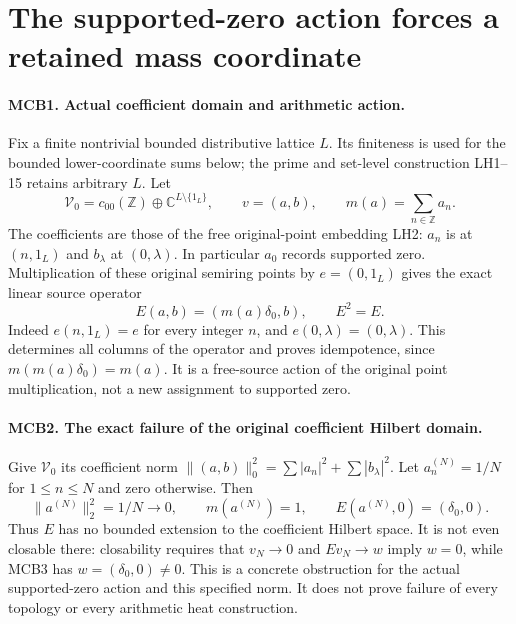 \section{The supported-zero action forces a retained mass coordinate}
\label{sec:supported-zero-mass-completion}

\paragraph{MCB1. Actual coefficient domain and arithmetic action.}
Fix a finite nontrivial bounded distributive lattice \(L\). Its
finiteness is used for the bounded lower-coordinate sums below;
the prime and set-level construction LH1--15 retains arbitrary
\(L\). Let
\[
 \mathcal V_0=c_{00}(\mathbb Z)\oplus
        \mathbb C^{L\setminus\{1_L\}},\qquad v=(a,b),\qquad
 m(a)=\sum_{n\in\mathbb Z}a_n .                    \tag{MCB1}
\]
The coefficients are those of the free original-point embedding
LH2: \(a_n\) is at \((n,1_L)\) and \(b_\lambda\) at
\((0,\lambda)\). In particular \(a_0\) records supported zero.
Multiplication of these original semiring points by
\(e=(0,1_L)\) gives the exact linear source operator
\[
 E(a,b)=(m(a)\delta_0,b),\qquad E^2=E .            \tag{MCB2}
\]
Indeed \(e(n,1_L)=e\) for every integer \(n\), and
\(e(0,\lambda)=(0,\lambda)\). This determines all columns of
the operator and proves idempotence, since \(m(m(a)\delta_0)=m(a)\).
It is a free-source action of the original point multiplication,
not a new assignment to supported zero.

\paragraph{MCB2. The exact failure of the original coefficient Hilbert domain.}
Give \(\mathcal V_0\) its coefficient norm
\(\|(a,b)\|_0^2=\sum|a_n|^2+\sum|b_\lambda|^2\).
Let \(a^{(N)}_n=1/N\) for \(1\le n\le N\) and zero otherwise.
Then
\[
 \|a^{(N)}\|_2^2=1/N\longrightarrow0,\qquad
 m(a^{(N)})=1,
 \qquad E(a^{(N)},0)=(\delta_0,0).               \tag{MCB3}
\]
Thus \(E\) has no bounded extension to the coefficient Hilbert
space. It is not even closable there: closability requires that
\(v_N\to0\) and \(Ev_N\to w\) imply \(w=0\), while MCB3
has \(w=(\delta_0,0)\ne0\). This is a concrete obstruction
for the actual supported-zero action and this specified norm.
It does not prove failure of every topology or every arithmetic
heat construction.

